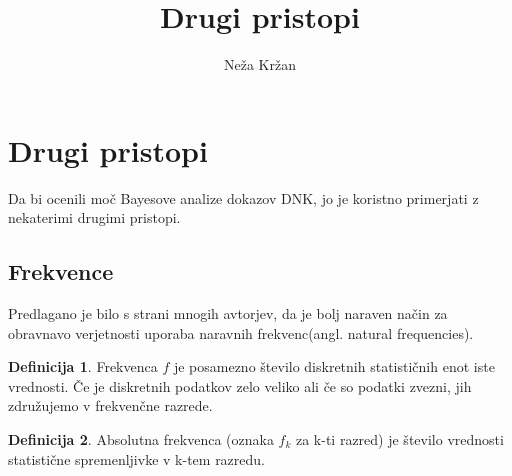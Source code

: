 \documentclass[12pt,a4paper]{amsart}
\theoremstyle{definition} %
\newtheorem{definicija}{Definicija}[section]
\theoremstyle{plain} %
\begin{document}
\title{Drugi pristopi}
\author{Neža Kržan}
\maketitle

\section{Drugi pristopi}
Da bi ocenili moč Bayesove analize dokazov DNK, jo je koristno primerjati z nekaterimi drugimi pristopi.

\subsection{Frekvence}
Predlagano je bilo s strani mnogih avtorjev, da je bolj naraven način za obravnavo verjetnosti uporaba naravnih frekvenc(angl. natural 
frequencies). 
\begin{definicija}
    Frekvenca $f$ je posamezno število diskretnih statističnih enot iste vrednosti. Če je diskretnih podatkov zelo veliko ali če so 
    podatki zvezni, jih združujemo v frekvenčne razrede.
\end{definicija}

\begin{definicija}
    Absolutna frekvenca (oznaka $f_k$ za k-ti razred) je število vrednosti statistične spremenljivke v k-tem razredu.
\end{definicija}
\end{document}
